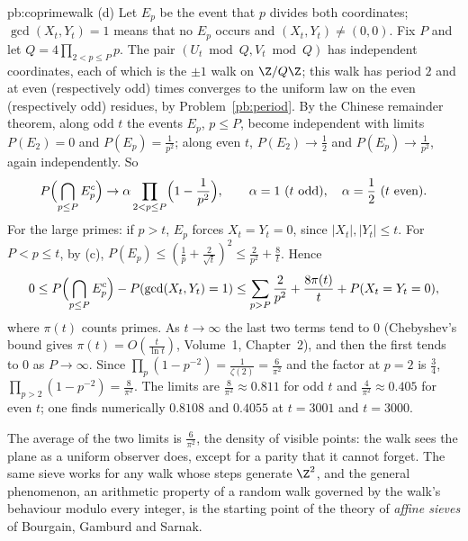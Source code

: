 \begin{solution}{pb:coprimewalk}
(d) Let $E_p$ be the event that $p$ divides both coordinates; $\gcd(X_t,Y_t)=1$ means that no $E_p$ occurs and $(X_t,Y_t)\ne(0,0)$. Fix $P$ and let $Q=4\prod_{2<p\le P}p$. The pair
$(U_t\bmod Q,V_t\bmod Q)$ has independent coordinates, each of which is the $\pm1$ walk on $\Z/Q\Z$; this walk has period $2$ and at even (respectively odd) times converges to the uniform law on the
even (respectively odd) residues, by Problem~\ref{pb:period}. By the Chinese remainder theorem, along odd $t$ the events $E_p$, $p\le P$, become independent with
limits $P(E_2)=0$ and $P(E_p)=\frac1{p^2}$; along even $t$, $P(E_2)\to\frac12$ and $P(E_p)\to\frac1{p^2}$, again independently. So
\[
P\Bigl(\bigcap_{p\le P}E_p^c\Bigr)\to\alpha\prod_{2<p\le P}\Bigl(1-\frac1{p^2}\Bigr),\qquad\alpha=1\ (t\text{ odd}),\quad\alpha=\frac12\ (t\text{ even}).
\]
For the large primes: if $p>t$, $E_p$ forces $X_t=Y_t=0$, since $|X_t|,|Y_t|\le t$. For $P<p\le t$, by (c), $P(E_p)\le(\frac1p+\frac2{\sqrt t})^2\le\frac2{p^2}+\frac8t$. Hence
\[
0\le P\Bigl(\bigcap_{p\le P}E_p^c\Bigr)-P(\gcd(X_t,Y_t)=1)\le\sum_{p>P}\frac2{p^2}+\frac{8\pi(t)}t+P(X_t=Y_t=0),
\]
where $\pi(t)$ counts primes. As $t\to\infty$ the last two terms tend to $0$ (Chebyshev's bound gives $\pi(t)=O(\frac t{\ln t})$, Volume~1, Chapter~2), and then the first tends to $0$ as $P\to\infty$. Since $\prod_{p}(1-p^{-2})=\frac1{\zeta(2)}=\frac6{\pi^2}$ and the factor at $p=2$ is $\frac34$, $\prod_{p>2}(1-p^{-2})=\frac8{\pi^2}$. The limits are
$\frac8{\pi^2}\approx0.811$ for odd $t$ and $\frac4{\pi^2}\approx0.405$ for even $t$; one finds numerically $0.8108$ and $0.4055$ at $t=3001$ and $t=3000$.

\leads The average of the two limits is $\frac6{\pi^2}$, the density of visible points: the walk sees the plane as a uniform observer does, except for a
parity that it cannot forget. The same sieve works for any walk whose steps generate $\Z^2$, and the general phenomenon, an arithmetic
property of a random walk governed by the walk's behaviour modulo every integer, is the starting point of the theory of \emph{affine sieves}
of Bourgain, Gamburd and Sarnak.
\end{solution}

